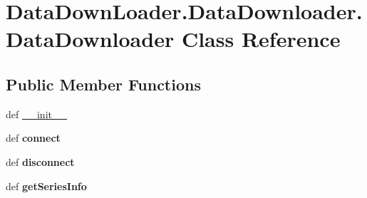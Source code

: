 \hypertarget{classDataDownLoader_1_1DataDownloader_1_1DataDownloader}{\section{\-Data\-Down\-Loader.\-Data\-Downloader.\-Data\-Downloader \-Class \-Reference}
\label{classDataDownLoader_1_1DataDownloader_1_1DataDownloader}
}
\subsection*{\-Public \-Member \-Functions}
\begin{DoxyCompactItemize}
\item 
def \hyperlink{classDataDownLoader_1_1DataDownloader_1_1DataDownloader_a0d7688ec628639f86c2f137208293129}{\-\_\-\-\_\-init\-\_\-\-\_\-}
\item 
\hypertarget{classDataDownLoader_1_1DataDownloader_1_1DataDownloader_aeb8e10c2d570de7c9b932519b2903d7a}{def {\bfseries connect}}\label{classDataDownLoader_1_1DataDownloader_1_1DataDownloader_aeb8e10c2d570de7c9b932519b2903d7a}

\item 
\hypertarget{classDataDownLoader_1_1DataDownloader_1_1DataDownloader_a544109f9686267410aa375399024e8c0}{def {\bfseries disconnect}}\label{classDataDownLoader_1_1DataDownloader_1_1DataDownloader_a544109f9686267410aa375399024e8c0}

\item 
\hypertarget{classDataDownLoader_1_1DataDownloader_1_1DataDownloader_ae6d6d0d42f9255680ebf3689596efbc6}{def {\bfseries get\-Series\-Info}}\label{classDataDownLoader_1_1DataDownloader_1_1DataDownloader_ae6d6d0d42f9255680ebf3689596efbc6}

\end{DoxyCompactItemize}
